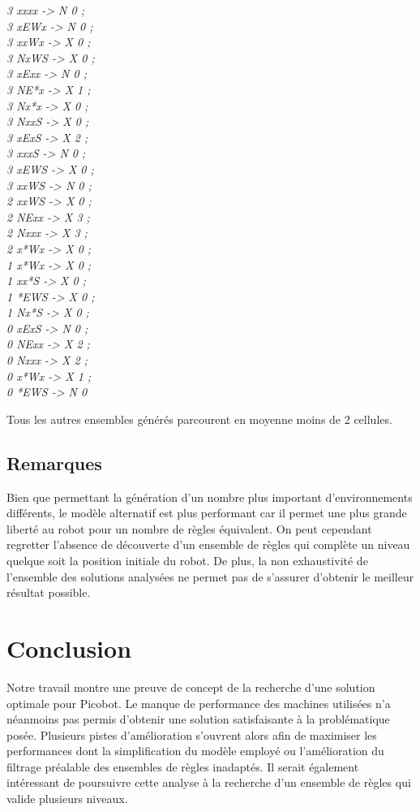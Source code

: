 \documentclass{article}
\begin{document}
\begin{center}
\textit{
3 xxxx -> N 0 ; \\
3 xEWx -> N 0 ; \\
3 xxWx -> X 0 ; \\
3 NxWS -> X 0 ; \\
3 xExx -> N 0 ; \\
3 NE*x -> X 1 ; \\
3 Nx*x -> X 0 ; \\
3 NxxS -> X 0 ; \\
3 xExS -> X 2 ; \\
3 xxxS -> N 0 ; \\
3 xEWS -> X 0 ; \\
3 xxWS -> N 0 ; \\
2 xxWS -> X 0 ; \\
2 NExx -> X 3 ; \\
2 Nxxx -> X 3 ; \\
2 x*Wx -> X 0 ; \\
1 x*Wx -> X 0 ; \\
1 xx*S -> X 0 ; \\
1 *EWS -> X 0 ; \\
1 Nx*S -> X 0 ; \\
0 xExS -> N 0 ; \\
0 NExx -> X 2 ; \\
0 Nxxx -> X 2 ; \\
0 x*Wx -> X 1 ; \\
0 *EWS -> N 0
}
\end{center}

Tous les autres ensembles générés parcourent en moyenne moins de 2
cellules.

\subsection{Remarques}

Bien que permettant la génération d’un nombre plus important
d’environnements différents, le modèle alternatif est plus performant
car il permet une plus grande liberté au robot pour un nombre de
règles équivalent. On peut cependant regretter l’absence de découverte
d’un ensemble de règles qui complète un niveau quelque soit la
position initiale du robot. De plus, la non exhaustivité de l’ensemble
des solutions analysées ne permet pas de s’assurer d’obtenir le
meilleur résultat possible.

\section{Conclusion}
\label{sec:conclusion}
Notre travail montre une preuve de concept de la recherche d’une
solution optimale pour Picobot. Le manque de performance des machines
utilisées n’a néanmoins pas permis d’obtenir une solution
satisfaisante à la problématique posée. Plusieurs pistes
d’amélioration s’ouvrent alors afin de maximiser les performances dont
la simplification du modèle employé ou l’amélioration du filtrage
préalable des ensembles de règles inadaptés. Il serait également
intéressant de poursuivre cette analyse à la recherche d’un ensemble
de règles qui valide plusieurs niveaux.
\end{document}
